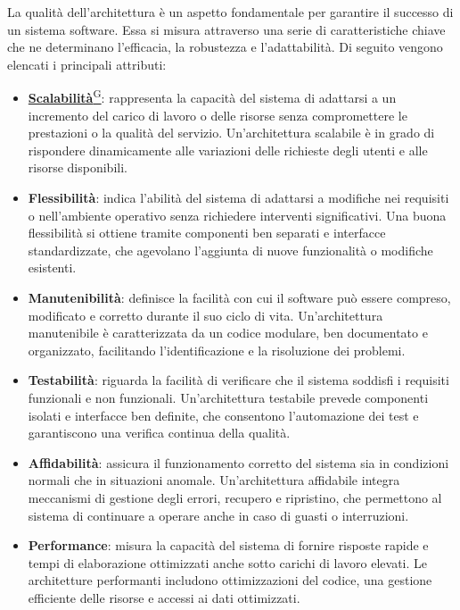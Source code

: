 La qualità dell'architettura è un aspetto fondamentale per garantire il successo di un sistema software. Essa si misura attraverso una serie di caratteristiche chiave che ne determinano l'efficacia, la robustezza e l'adattabilità. Di seguito vengono elencati i principali attributi:
\begin{itemize}
    \item \href{https://code7crusaders.github.io/docs/PB/documentazione_interna/glossario.html#scalabilità}{\textbf{Scalabilità}\textsuperscript{G}}: rappresenta la capacità del sistema di adattarsi a un incremento del carico di lavoro o delle risorse senza compromettere le prestazioni o la qualità del servizio. Un'architettura scalabile è in grado di rispondere dinamicamente alle variazioni delle richieste degli utenti e alle risorse disponibili.
    \item \textbf{Flessibilità}: indica l'abilità del sistema di adattarsi a modifiche nei requisiti o nell'ambiente operativo senza richiedere interventi significativi. Una buona flessibilità si ottiene tramite componenti ben separati e interfacce standardizzate, che agevolano l'aggiunta di nuove funzionalità o modifiche esistenti.
    \item \textbf{Manutenibilità}: definisce la facilità con cui il software può essere compreso, modificato e corretto durante il suo ciclo di vita. Un'architettura manutenibile è caratterizzata da un codice modulare, ben documentato e organizzato, facilitando l'identificazione e la risoluzione dei problemi.
    \item \textbf{Testabilità}: riguarda la facilità di verificare che il sistema soddisfi i requisiti funzionali e non funzionali. Un'architettura testabile prevede componenti isolati e interfacce ben definite, che consentono l'automazione dei test e garantiscono una verifica continua della qualità.
    \item \textbf{Affidabilità}: assicura il funzionamento corretto del sistema sia in condizioni normali che in situazioni anomale. Un'architettura affidabile integra meccanismi di gestione degli errori, recupero e ripristino, che permettono al sistema di continuare a operare anche in caso di guasti o interruzioni.
    \item \textbf{Performance}: misura la capacità del sistema di fornire risposte rapide e tempi di elaborazione ottimizzati anche sotto carichi di lavoro elevati. Le architetture performanti includono ottimizzazioni del codice, una gestione efficiente delle risorse e accessi ai dati ottimizzati.

\end{itemize}
